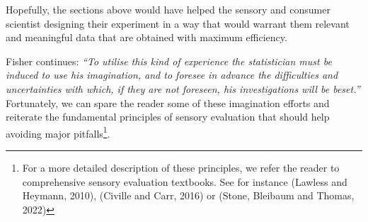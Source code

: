 \documentclass[
]{book}
\begin{document}
Hopefully, the sections above would have helped the sensory and consumer scientist designing their experiment in a way that would warrant them relevant and meaningful data that are obtained with maximum efficiency.

Fisher continues: \emph{``To utilise this kind of experience the statistician must be induced to use his imagination, and to foresee in advance the difficulties and uncertainties with which, if they are not foreseen, his investigations will be beset.''}
Fortunately, we can spare the reader some of these imagination efforts and reiterate the fundamental principles of sensory evaluation that should help avoiding major pitfalls\footnote{For a more detailed description of these principles, we refer the reader to comprehensive sensory evaluation textbooks. See for instance (Lawless and Heymann, 2010), (Civille and Carr, 2016) or (Stone, Bleibaum and Thomas, 2022)}.
\end{document}
